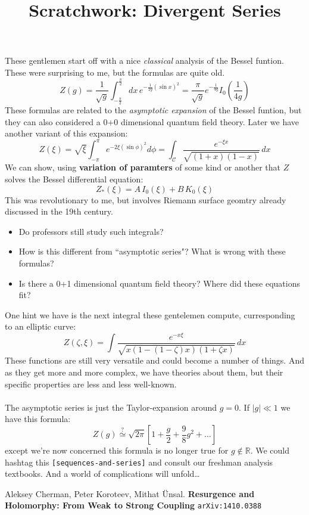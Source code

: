\documentclass[12pt]{article}
\title{Scratchwork: Divergent Series}
\date{}
\begin{document}

\sffamily

\maketitle

\noindent These gentlemen start off with a nice \textit{classical} analysis of the Bessel funtion.  These were surprising to me, but the formulas are quite old.
$$ Z(g) = \frac{1}{\sqrt{g}} \int_{-\frac{\pi}{2}}^{\frac{\pi}{2}} dx \, e^{- \frac{1}{2g} (\sin x)^2} 
= \frac{\pi}{\sqrt{g}} e^{-\frac{1}{4g}} I_0(\frac{1}{4g})$$
These formulas are related to the \textit{asymptotic expansion} of the Bessel funtion, but they can also considered a 0+0 dimensional quantum field theory. Later we have another variant of this expansion:
$$ Z(\xi) = \sqrt{\xi} \int_{-\pi}^{\pi}e^{-2\xi (\sin \phi)^2} d\phi 
= \int_{\mathcal{C}} \frac{e^{-\xi x}}{\sqrt{(1+x)(1-x)}}\, dx$$
We can show, using \textbf{variation of paramters} of some kind or another that $Z$ solves the Bessel differential equation:
$$ Z_*(\xi) = A \, I_0(\xi) + B \, K_0 (\xi)$$
This was revolutionary to me, but involves Riemann surface geomtry already discussed in the 19th century.  
\begin{itemize}
\item Do professors still study such integrals?
\item How is this different from ``asymptotic series"?  What is wrong with these formulas?
\item Is there a 0+1 dimensional quantum field theory? Where did these equations fit?
\end{itemize}
One hint we have is the next integral these gentelemen compute, curresponding to an elliptic curve:
$$ Z(\zeta, \xi) = \int \frac{e^{-x\xi}}{\sqrt{x(1 - (1 - \zeta)x)(1 + \zeta x)}} \, dx$$
These functions are still very versatile and could become a number of things.  And as they get more and more complex, we have theories about them, but their specific properties are less and less well-known. \\ \\
The asymptotic series is just the Taylor-expansion around $g = 0$.   If $|g| \ll 1$ we have this formula:
$$ Z(g) \stackrel{?}{\simeq} \sqrt{2\pi} \left[ 1 + \frac{g}{2} + \frac{9}{8}g^2 + \dots \right]$$
except we're now concerned this formula is no longer true for $g \notin \mathbb{R}$.  We could hashtag this \texttt{[sequences-and-series]} and consult our freshman analysis textbooks.  And a world of complications will unfold\dots
\vfill

\begin{thebibliography}{}

\item Aleksey Cherman, Peter Koroteev, Mithat Ünsal.  \textbf{Resurgence and Holomorphy: From Weak to Strong Coupling} \texttt{arXiv:1410.0388}
 
\end{thebibliography}
\end{document}
